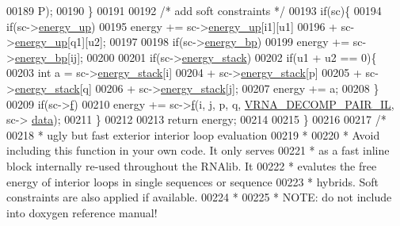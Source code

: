 \begin{DoxyCode}
00189                             P);
00190   \}
00191 
00192   \textcolor{comment}{/* add soft constraints */}
00193   \textcolor{keywordflow}{if}(sc)\{
00194     \textcolor{keywordflow}{if}(sc->\hyperlink{group__soft__constraints_a57e4dbb924ab11f304e3762a3a9b07a1}{energy\_up})
00195       energy += sc->\hyperlink{group__soft__constraints_a57e4dbb924ab11f304e3762a3a9b07a1}{energy\_up}[i1][u1]
00196                 + sc->\hyperlink{group__soft__constraints_a57e4dbb924ab11f304e3762a3a9b07a1}{energy\_up}[q1][u2];
00197 
00198     \textcolor{keywordflow}{if}(sc->\hyperlink{group__soft__constraints_ad139b8e06632e00cbcf3909815d0d03d}{energy\_bp})
00199       energy += sc->\hyperlink{group__soft__constraints_ad139b8e06632e00cbcf3909815d0d03d}{energy\_bp}[ij];
00200 
00201     \textcolor{keywordflow}{if}(sc->\hyperlink{group__soft__constraints_ac20dded6068e81acd0f1139092f66a22}{energy\_stack})
00202       \textcolor{keywordflow}{if}(u1 + u2 == 0)\{
00203         \textcolor{keywordtype}{int} a =   sc->\hyperlink{group__soft__constraints_ac20dded6068e81acd0f1139092f66a22}{energy\_stack}[i]
00204                   + sc->\hyperlink{group__soft__constraints_ac20dded6068e81acd0f1139092f66a22}{energy\_stack}[p]
00205                   + sc->\hyperlink{group__soft__constraints_ac20dded6068e81acd0f1139092f66a22}{energy\_stack}[q]
00206                   + sc->\hyperlink{group__soft__constraints_ac20dded6068e81acd0f1139092f66a22}{energy\_stack}[j];
00207         energy += a;
00208       \}
00209     \textcolor{keywordflow}{if}(sc->\hyperlink{group__soft__constraints_a32dc86090237888c75491bbd4861a04b}{f})
00210       energy += sc->\hyperlink{group__soft__constraints_a32dc86090237888c75491bbd4861a04b}{f}(i, j, p, q, \hyperlink{group__constraints_gaeab04f34d7730cff2d651d782f95d857}{VRNA\_DECOMP\_PAIR\_IL}, sc->
      \hyperlink{group__soft__constraints_a7574680143df97b9029146c2150bf06d}{data});
00211   \}
00212 
00213   \textcolor{keywordflow}{return} energy;
00214 
00215 \}
00216 
00217 \textcolor{comment}{/*}
00218 \textcolor{comment}{ *  ugly but fast exterior interior loop evaluation}
00219 \textcolor{comment}{ *}
00220 \textcolor{comment}{ *  Avoid including this function in your own code. It only serves}
00221 \textcolor{comment}{ *  as a fast inline block internally re-used throughout the RNAlib. It}
00222 \textcolor{comment}{ *  evalutes the free energy of interior loops in single sequences or sequence}
00223 \textcolor{comment}{ *  hybrids. Soft constraints are also applied if available.}
00224 \textcolor{comment}{ *}
00225 \textcolor{comment}{ *  NOTE: do not include into doxygen reference manual!}

\end{DoxyCode}
